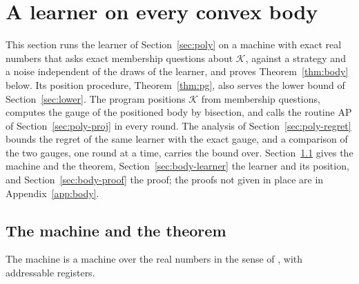 \documentclass[11pt]{amsart}
\theoremstyle{definition}
\numberwithin{equation}{section}
\newcommand{\cK}{\mathcal{K}}
\begin{document}
\section{A learner on every convex body}\label{sec:body}

This section runs the learner of Section~\ref{sec:poly} on a machine with exact real numbers that asks exact membership questions about $\cK$, against a strategy and a noise independent of the draws of the learner, and proves Theorem~\ref{thm:body} below. Its position procedure, Theorem~\ref{thm:pg}, also serves the lower bound of Section~\ref{sec:lower}. The program positions $\cK$ from membership questions, computes the gauge of the positioned body by bisection, and calls the routine AP of Section~\ref{sec:poly-proj} in every round. The analysis of Section~\ref{sec:poly-regret} bounds the regret of the same learner with the exact gauge, and a comparison of the two gauges, one round at a time, carries the bound over. Section~\ref{sec:body-machine} gives the machine and the theorem, Section~\ref{sec:body-learner} the learner and its position, and Section~\ref{sec:body-proof} the proof; the proofs not given in place are in Appendix~\ref{app:body}.

\subsection{The machine and the theorem}\label{sec:body-machine}

The machine is a machine over the real numbers in the sense of \cite[Section~2]{BSS89}, with addressable registers.
\end{document}
